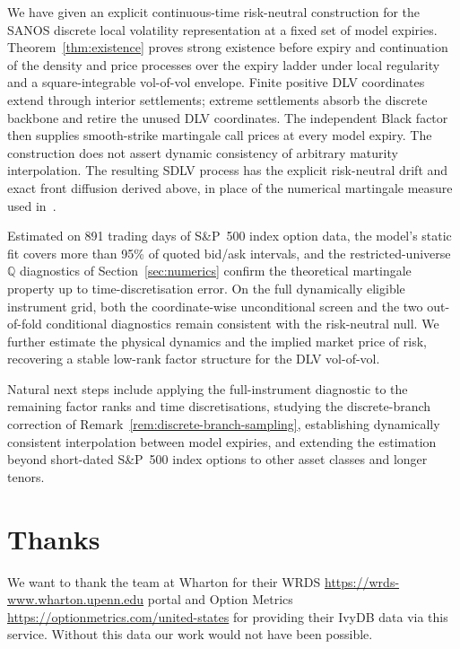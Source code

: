 \documentclass[11pt]{article}
\newcommand{\Q}{\mathbb Q}
\theoremstyle{plain}
\theoremstyle{definition}
\theoremstyle{remark}
\begin{document}
We have given an explicit continuous-time risk-neutral construction for the SANOS
discrete local volatility representation at a fixed set of model expiries.
Theorem~\ref{thm:existence} proves strong existence before expiry and continuation
of the density and price processes over the expiry ladder under local regularity
and a square-integrable vol-of-vol envelope. Finite positive DLV coordinates
extend through interior settlements; extreme settlements absorb the discrete
backbone and retire the unused DLV coordinates. The independent Black factor
then supplies smooth-strike martingale call prices at every model expiry.
The construction does not assert dynamic consistency of arbitrary maturity interpolation.
The resulting SDLV process has the explicit risk-neutral drift and exact front diffusion
derived above, in place of the numerical martingale measure used in~\cite{DYSANOS2026}.

Estimated on 891 trading days of S\&P~500 index option data, the model's static fit covers more
than 95\% of quoted bid/ask intervals, and the restricted-universe $\Q$ diagnostics of
Section~\ref{sec:numerics} confirm the theoretical martingale property up to time-discretisation
error.  On the full dynamically eligible instrument grid, both the
coordinate-wise unconditional screen and the two out-of-fold conditional
diagnostics remain consistent with the risk-neutral null.  We
further estimate the physical dynamics and the implied market price of risk, recovering a
stable low-rank factor structure for the DLV vol-of-vol.

Natural next steps include applying the full-instrument diagnostic to the
remaining factor ranks and time discretisations, studying the discrete-branch
correction of Remark~\ref{rem:discrete-branch-sampling}, establishing dynamically
consistent interpolation between model expiries, and extending
the estimation beyond short-dated S\&P~500 index options to other asset classes and longer
tenors.

\section{Thanks}

We want to thank the team at Wharton for their WRDS \url{https://wrds-www.wharton.upenn.edu} portal and Option Metrics \url{https://optionmetrics.com/united-states} 
for providing their IvyDB data via this service. Without this data our work would not have been possible.

\appendix





\end{document}

